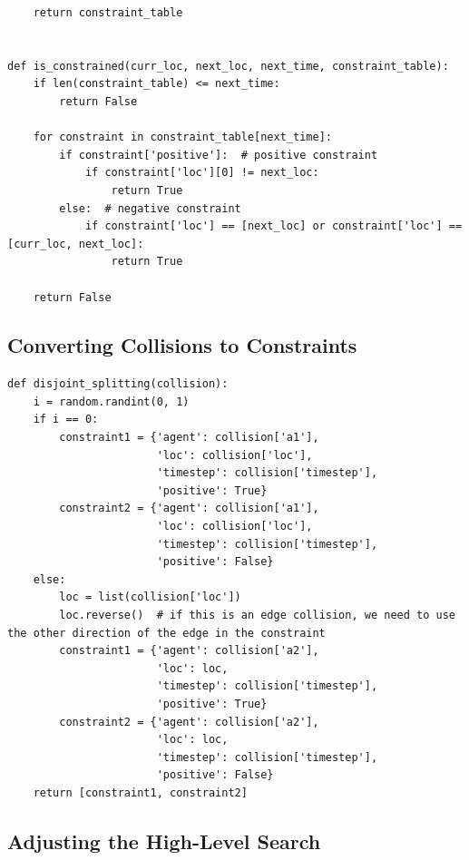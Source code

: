 \documentclass[11pt]{article}
\begin{document}
\begin{verbatim}
    return constraint_table


def is_constrained(curr_loc, next_loc, next_time, constraint_table):
    if len(constraint_table) <= next_time:
        return False

    for constraint in constraint_table[next_time]:
        if constraint['positive']:  # positive constraint
            if constraint['loc'][0] != next_loc:
                return True
        else:  # negative constraint
            if constraint['loc'] == [next_loc] or constraint['loc'] == [curr_loc, next_loc]:
                return True 

    return False
\end{verbatim}

\subsection{Converting Collisions to Constraints}

\begin{verbatim}
def disjoint_splitting(collision):
    i = random.randint(0, 1)
    if i == 0:
        constraint1 = {'agent': collision['a1'],
                       'loc': collision['loc'],
                       'timestep': collision['timestep'],
                       'positive': True}
        constraint2 = {'agent': collision['a1'],
                       'loc': collision['loc'],
                       'timestep': collision['timestep'],
                       'positive': False}
    else:
        loc = list(collision['loc'])
        loc.reverse()  # if this is an edge collision, we need to use the other direction of the edge in the constraint
        constraint1 = {'agent': collision['a2'],
                       'loc': loc,
                       'timestep': collision['timestep'],
                       'positive': True}
        constraint2 = {'agent': collision['a2'],
                       'loc': loc,
                       'timestep': collision['timestep'],
                       'positive': False}
    return [constraint1, constraint2]
\end{verbatim}

\subsection{Adjusting the High-Level Search}
\end{document}
